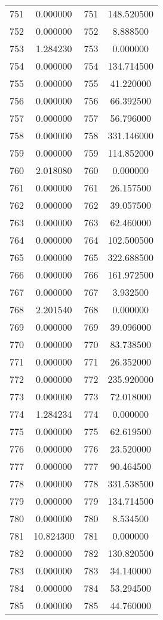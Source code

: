 \documentclass[12pt]{article}
\begin{document}
\begin{longtable}{@{}cccc@{}}
751 & 0.000000 & 751 & 148.520500 \\
752 & 0.000000 & 752 & 8.888500 \\
753 & 1.284230 & 753 & 0.000000 \\
754 & 0.000000 & 754 & 134.714500 \\
755 & 0.000000 & 755 & 41.220000 \\
756 & 0.000000 & 756 & 66.392500 \\
757 & 0.000000 & 757 & 56.796000 \\
758 & 0.000000 & 758 & 331.146000 \\
759 & 0.000000 & 759 & 114.852000 \\
760 & 2.018080 & 760 & 0.000000 \\
761 & 0.000000 & 761 & 26.157500 \\
762 & 0.000000 & 762 & 39.057500 \\
763 & 0.000000 & 763 & 62.460000 \\
764 & 0.000000 & 764 & 102.500500 \\
765 & 0.000000 & 765 & 322.688500 \\
766 & 0.000000 & 766 & 161.972500 \\
767 & 0.000000 & 767 & 3.932500 \\
768 & 2.201540 & 768 & 0.000000 \\
769 & 0.000000 & 769 & 39.096000 \\
770 & 0.000000 & 770 & 83.738500 \\
771 & 0.000000 & 771 & 26.352000 \\
772 & 0.000000 & 772 & 235.920000 \\
773 & 0.000000 & 773 & 72.018000 \\
774 & 1.284234 & 774 & 0.000000 \\
775 & 0.000000 & 775 & 62.619500 \\
776 & 0.000000 & 776 & 23.520000 \\
777 & 0.000000 & 777 & 90.464500 \\
778 & 0.000000 & 778 & 331.538500 \\
779 & 0.000000 & 779 & 134.714500 \\
780 & 0.000000 & 780 & 8.534500 \\
781 & 10.824300 & 781 & 0.000000 \\
782 & 0.000000 & 782 & 130.820500 \\
783 & 0.000000 & 783 & 34.140000 \\
784 & 0.000000 & 784 & 53.294500 \\
785 & 0.000000 & 785 & 44.760000 \\

\end{longtable}
\end{document}

